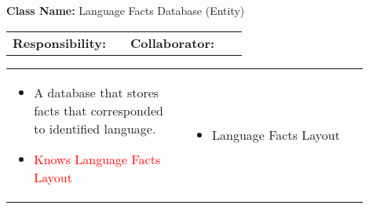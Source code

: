 \begin{cards}[]
    \textbf{Class Name:} Language Facts Database (Entity)
    \tcbline
    \begin{tabular}{p{0.45\linewidth} | p{0.45\linewidth}}
        \textbf{Responsibility:}& 
        \textbf{Collaborator:}\\
    \end{tabular}
    \tcbline
    \begin{tabular}{p{0.45\linewidth} | p{0.45\linewidth}}
        \begin{itemize}
            \item A database that stores facts that corresponded to identified language.
            \item \textcolor{red}{Knows Language Facts Layout}
        \end{itemize}
        &
        \begin{itemize}
            \item Language Facts Layout
        \end{itemize}
    \end{tabular}
\end{cards}